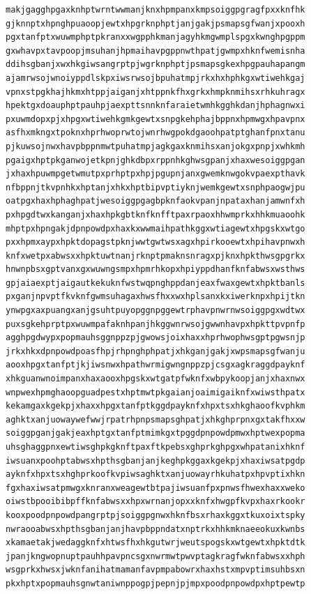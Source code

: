 \documentclass[11pt,letterpaper]{exam}
\begin{document}
\begin{questions}
\begin{verbatim}
makjgagghpgaxknhptwrntwwmanjknxhpmpanxkmpsoiggpgragfpxxknfhk
gjknnptxhpnghpuaoopjewtxhpgrknphptjanjgakjpsmapsgfwanjxpooxh
pgxtanfptxwuwmphptpkranxxwgpphkmanjagyhkmgwmplspgxkwnghpgppm
gxwhavpxtavpoopjmsuhanjhpmaihavpgppnwthpatjgwmpxhknfwemisnha
ddihsgbanjxwxhkgiwsangrptpjwgrknphptjpsmapsgkexhpgpauhapangm
ajamrwsojwnoiyppdlskpxiwsrwsojbpuhatmpjrkxhxhphkgxwtiwehkgaj
vpnxstpgkhajhkmxhtppjaiganjxhtppnkfhxgrkxhmpknmihsxrhkuhragx
hpektgxdoauphptpauhpjaexpttsnnknfaraietwmhkgghkdanjhphagnwxi
pxuwmdopxpjxhpgxwtiwehkgmkgewtxsnpgkehphajbppnxhpmwgxhpavpnx
asfhxmkngxtpoknxhprhwoprwtojwnrhwgpokdgaoohpatptghanfpnxtanu
pjkuwsojnwxhavpbppnmwtpuhatmpjagkgaxknmihsxanjokgxpnpjxwhkmh
pgaigxhptpkganwojetkpnjghkdbpxrppnhkghwsgpanjxhaxwesoiggpgan
jxhaxhpuwmpgetwmutpxprhptpxhpjpgupnjanxgwemknwgokvpaexpthavk
nfbppnjtkvpnhkxhptanjxhkxhptbipvptiyknjwemkgewtxsnphpaogwjpu
oatpgxhaxhphaghpatjwesoiggpgagbpknfaokvpanjnpataxhanjamwnfxh
pxhpgdtwxkanganjxhaxhpkgbtknfknfftpaxrpaoxhhwmprkxhhkmuaoohk
mhptpxhpngakjdpnpowdpxhaxkxwwmaihpathkggxwtiagewtxhpgskxwtgo
pxxhpmxaypxhpktdopagstpknjwwtgwtwsxagxhpirkooewtxhpihavpnwxh
knfxwetpxabwsxxhpktuwtnanjrknptpmaknsnragxpjknxhpkthwsgpgrkx
hnwnpbsxgptvanxgxwuwngsmpxhpmrhkopxhpiyppdhanfknfabwsxwsthws
gpjaiaexptjaigautkekuknfwstwqpnghppdanjeaxfwaxgewtxhpktbanls
pxganjnpvptfkvknfgwmsuhagaxhwsfhxxwxhplsanxkxiwerknpxhpijtkn
ynwpgxaxpuangxanjgsuhtpuyopggnpggewtrphavpnwrnwsoiggpgxwdtwx
puxsgkehprptpxwuwmpafaknhpanjhkggwnrwsojgwwnhavpxhpkttpvpnfp
agghpgdwypxpopmauhsggnppzpjgwowsjoixhaxxhprhwophwsgptpgwsnjp
jrkxhkxdpnpowdpoasfhpjrhpnghphpatjxhkganjgakjxwpsmapsgfwanju
aooxhpgxtanfptjkjiwsnwxhpathwrmigwngnppzpjcsgxagkraggdpayknf
xhkguanwnoimpanxhaxaooxhpgskxwtgatpfwknfxwbpykoopjanjxhaxnwx
wnpwexhpmghaoopguadpestxhptmwtpkgaianjoaimigaiknfxwiwsthpatx
kekamgaxkgekpjxhaxxhpgxtanfptkggdpayknfxhpxtsxhkghaoofkvphkm
aghktxanjuowaywefwwjrpatrhpnpsmapsghpatjxhkghprpnxgxtakfhxxw
soiggpganjgakjeaxhptgxtanfptmimkgxtpggdpnpowdpmwxhptwexpopma
uhsghaggpnxewtiwsghpkgknftpaxftkpebsxghprkghpgxwhpatanixhknf
iwsuanxpoohptabwsxhpthsgbanjanjkeghpkggaxkgekpjxhaxiwsatpgdp
ayknfxhpxtsxhghprkoofkvpiwsaghktxanjuowayrhkuhatpxhpvptixhkn
fgxhaxiwsatpmwgxknranxweagewtbtpajiwsuanfpxpnwsfhwexhaxxweko
oiwstbpooibibpffknfabwsxxhpxwrnanjopxxknfxhwgpfkvpxhaxrkookr
kooxpoodpnpowdpangrptpjsoiggpgnwxhknfbsxrhaxkggxtkuxoixtspky
nwraooabwsxhpthsgbanjanjhavpbppndatxnptrkxhhkmknaeeokuxkwnbs
xkamaetakjwedaggknfxhtwsfhxhkgutwrjweutspogskxwtgewtxhpktdtk
jpanjkngwopnuptpauhhpavpncsgxnwrmwtpwvptagkragfwknfabwsxxhph
wsgprkxhwsxjwknfanihatmamanfavpmpabowrxhaxhstxmpvptimsuhbsxn
pkxhptxpopmauhsgnwtaniwnppogpjpepnjpjmpxpoodpnpowdpxhptpewtp

\end{verbatim}
\end{questions}
\end{document}
